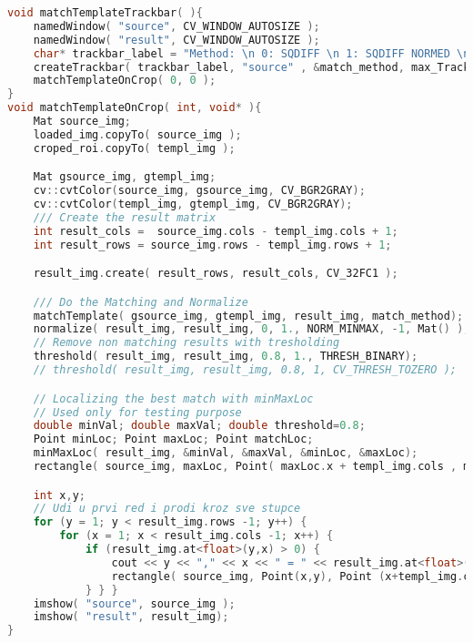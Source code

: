 \begin{lstlisting}[language=C,caption={Podudaranje susjedstva piksela s
    modelom}]
void matchTemplateTrackbar( ){
    namedWindow( "source", CV_WINDOW_AUTOSIZE );
    namedWindow( "result", CV_WINDOW_AUTOSIZE );
    char* trackbar_label = "Method: \n 0: SQDIFF \n 1: SQDIFF NORMED \n 2: TM CCORR \n 3: TM CCORR NORMED \n 4: TM COEFF \n 5: TM COEFF NORMED";
    createTrackbar( trackbar_label, "source" , &match_method, max_Trackbar, matchTemplateOnCrop );
    matchTemplateOnCrop( 0, 0 );
}
void matchTemplateOnCrop( int, void* ){
    Mat source_img;
    loaded_img.copyTo( source_img );
    croped_roi.copyTo( templ_img );

    Mat gsource_img, gtempl_img;
    cv::cvtColor(source_img, gsource_img, CV_BGR2GRAY);
    cv::cvtColor(templ_img, gtempl_img, CV_BGR2GRAY);
    /// Create the result matrix
    int result_cols =  source_img.cols - templ_img.cols + 1;
    int result_rows = source_img.rows - templ_img.rows + 1;   

    result_img.create( result_rows, result_cols, CV_32FC1 );

    /// Do the Matching and Normalize
    matchTemplate( gsource_img, gtempl_img, result_img, match_method);
    normalize( result_img, result_img, 0, 1., NORM_MINMAX, -1, Mat() );
    // Remove non matching results with tresholding
    threshold( result_img, result_img, 0.8, 1., THRESH_BINARY);
    // threshold( result_img, result_img, 0.8, 1, CV_THRESH_TOZERO );

    // Localizing the best match with minMaxLoc
    // Used only for testing purpose
    double minVal; double maxVal; double threshold=0.8;
    Point minLoc; Point maxLoc; Point matchLoc;
    minMaxLoc( result_img, &minVal, &maxVal, &minLoc, &maxLoc);
    rectangle( source_img, maxLoc, Point( maxLoc.x + templ_img.cols , maxLoc.y + templ_img.rows ), Scalar(0,0,255) ); 

    int x,y;
    // Udi u prvi red i prodi kroz sve stupce 
    for (y = 1; y < result_img.rows -1; y++) {
        for (x = 1; x < result_img.cols -1; x++) {
            if (result_img.at<float>(y,x) > 0) {
                cout << y << "," << x << " = " << result_img.at<float>(y,x) << endl; 
                rectangle( source_img, Point(x,y), Point (x+templ_img.cols, y+templ_img.rows), Scalar(0,255,0));  
            } } }
    imshow( "source", source_img );
    imshow( "result", result_img);
}
\end{lstlisting}


